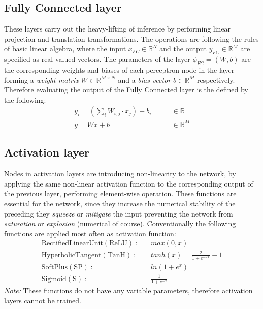 \subsection{Fully Connected layer} 
These layers carry out the heavy-lifting of inference by performing linear projection and translation transformations. 
The operations are following the rules of basic linear algebra, where the input $x_{FC} \in \mathbb{R}^N$ and the output $y_{FC} \in \mathbb{R}^M$ are specified as real valued vectors.
The parameters of the layer $\phi_{FC}=(W, b)$ are the corresponding weights and biases of each perceptron node in the layer forming a \emph{weight matrix} $W \in \mathbb{R}^{M \times N}$ and a \emph{bias vector} $b \in \mathbb{R}^M$ respectively.
Therefore evaluating the output of the Fully Connected layer is the defined by the following:
\begin{equation}\label{eq:FC}
\begin{split}
    y_i = \left(\sum_i W_{i,j} \cdot x_j \right) + b_i \qquad &\in \mathbb{R}\\
    y = Wx + b \qquad &\in \mathbb{R}^M
\end{split}
\end{equation}
\subsection{Activation layer} 
Nodes in activation layers are introducing non-linearity to the network, by applying the same non-linear activation function to the corresponding output of the previous layer, performing element-wise operation.
These functions are essential for the network, since they increase the numerical stability of the preceding they \emph{squeeze} or \emph{mitigate} the input preventing the network from \emph{saturation} or \emph{explosion} (numerical of course). Conventionally the following functions are applied most often as activation function:
\begin{align*}
    \mathrm{Rectified Linear Unit (ReLU) := } &max(0, x) \\
    \mathrm{Hyperbolic Tangent (TanH) := }   &tanh(x) = \frac{2}{1+e^{-2x}}-1 \\
    \mathrm{SoftPlus (SP) := }   &ln(1+e^x) \\
    \mathrm{Sigmoid (S) := }  &\frac{1}{1+e^{-x}}
\end{align*}
\emph{Note:} These functions do not have any variable parameters, therefore activation layers cannot be trained.

